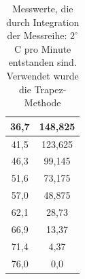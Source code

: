 \begin{table}[htbp]
\begin{minipage}[t]{0.45\textwidth}
\begin{tabular}{c|c}
36,7 &148,825\\\hline
41,5 &123,625\\\hline
46,3 &99,145\\\hline
51,6 &73,175\\\hline
57,0 &48,875\\\hline
62,1 &28,73\\\hline
66,9 &13,37\\\hline
71,4 &4,37\\\hline
76,0 &0,0\\\hline
\end{tabular}
\end{minipage}
\caption{Messwerte, die durch Integration der  Messreihe: $2^\circ$C pro Minute entstanden sind. Verwendet wurde die Trapez-Methode}
\label{tab_int2}
\end{table}


